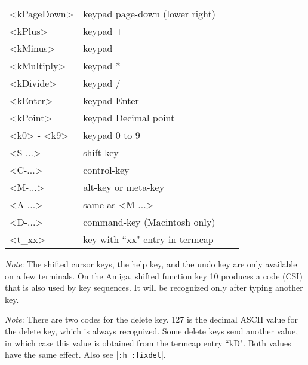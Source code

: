 \begin{description}
\begin{center}
\begin{tabularx}{\textwidth}{|l|X|l|l|}
				<kPageDown>      & keypad page-down (lower right) &  &   \label{keypad-page-down}\\
				<kPlus>          & keypad +                       &  &   \label{keypad-plus}\\
				<kMinus>         & keypad -                       &  &   \label{keypad-minus}\\
				<kMultiply>      & keypad *                       &  &   \label{keypad-multiply}\\
				<kDivide>        & keypad /                       &  &   \label{keypad-divide}\\
				<kEnter>         & keypad Enter                   &  &   \label{keypad-enter}\\
				<kPoint>         & keypad Decimal point           &  &   \label{keypad-point}\\
				<k0> - <k9>      & keypad 0 to 9                  &  &   \label{keypad-0} \label{keypad-9}\\
				<S-...>          & shift-key                      &  &   \label{shift} \label{<S-}\\
				<C-...>          & control-key                    &  &   \label{control} \label{ctrl} \label{<C-}\\
				<M-...>          & alt-key or meta-key            &  &   \label{meta} \label{alt} \label{<M-}\\
				<A-...>          & same as <M-...>                &  &   \label{<A-}\\
				<D-...>          & command-key (Macintosh only)   &  &   \label{<D-}\\
				<t\_xx>          & key with ``xx" entry in termcap &  &   \\ \hline

\end{tabularx} \end{center}

\textit{Note}: The shifted cursor keys, the help key, and the undo key are only available on a few terminals.
On the Amiga, shifted function key 10 produces a code (CSI) that is also used by key sequences.
It will be recognized only after typing another key.

\textit{Note}: There are two codes for the delete key.
127 is the decimal ASCII value for the delete key, which is always recognized.
Some delete keys send another value, in which case this value is obtained from the termcap entry ``kD".
Both values have the same effect.
Also see |\texttt{:h :fixdel}|.


\end{description}
